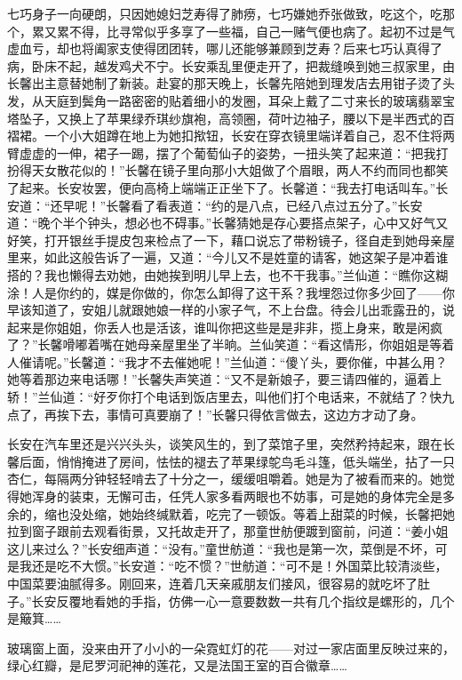 \par 七巧身子一向硬朗，只因她媳妇芝寿得了肺痨，七巧嫌她乔张做致，吃这个，吃那个，累又累不得，比寻常似乎多享了一些福，自己一赌气便也病了。起初不过是气虚血亏，却也将阖家支使得团团转，哪儿还能够兼顾到芝寿？后来七巧认真得了病，卧床不起，越发鸡犬不宁。长安乘乱里便走开了，把裁缝唤到她三叔家里，由长馨出主意替她制了新装。赴宴的那天晚上，长馨先陪她到理发店去用钳子烫了头发，从天庭到鬓角一路密密的贴着细小的发圈，耳朵上戴了二寸来长的玻璃翡翠宝塔坠子，又换上了苹果绿乔琪纱旗袍，高领圈，荷叶边袖子，腰以下是半西式的百褶裙。一个小大姐蹲在地上为她扣揿钮，长安在穿衣镜里端详着自己，忍不住将两臂虚虚的一伸，裙子一踢，摆了个葡萄仙子的姿势，一扭头笑了起来道：“把我打扮得天女散花似的！”长馨在镜子里向那小大姐做了个眉眼，两人不约而同也都笑了起来。长安妆罢，便向高椅上端端正正坐下了。长馨道：“我去打电话叫车。”长安道：“还早呢！”长馨看了看表道：“约的是八点，已经八点过五分了。”长安道：“晚个半个钟头，想必也不碍事。”长馨猜她是存心要搭点架子，心中又好气又好笑，打开银丝手提皮包来检点了一下，藉口说忘了带粉镜子，径自走到她母亲屋里来，如此这般告诉了一遍，又道：“今儿又不是姓童的请客，她这架子是冲着谁搭的？我也懒得去劝她，由她挨到明儿早上去，也不干我事。”兰仙道：“瞧你这糊涂！人是你约的，媒是你做的，你怎么卸得了这干系？我埋怨过你多少回了——你早该知道了，安姐儿就跟她娘一样的小家子气，不上台盘。待会儿出乖露丑的，说起来是你姐姐，你丢人也是活该，谁叫你把这些是是非非，揽上身来，敢是闲疯了？”长馨嗗嘟着嘴在她母亲屋里坐了半晌。兰仙笑道：“看这情形，你姐姐是等着人催请呢。”长馨道：“我才不去催她呢！”兰仙道：“傻丫头，要你催，中甚么用？她等着那边来电话哪！”长馨失声笑道：“又不是新娘子，要三请四催的，逼着上轿！”兰仙道：“好歹你打个电话到饭店里去，叫他们打个电话来，不就结了？快九点了，再挨下去，事情可真要崩了！”长馨只得依言做去，这边方才动了身。
\par 长安在汽车里还是兴兴头头，谈笑风生的，到了菜馆子里，突然矜持起来，跟在长馨后面，悄悄掩进了房间，怯怯的褪去了苹果绿鸵鸟毛斗篷，低头端坐，拈了一只杏仁，每隔两分钟轻轻啃去了十分之一，缓缓咀嚼着。她是为了被看而来的。她觉得她浑身的装束，无懈可击，任凭人家多看两眼也不妨事，可是她的身体完全是多余的，缩也没处缩，她始终缄默着，吃完了一顿饭。等着上甜菜的时候，长馨把她拉到窗子跟前去观看街景，又托故走开了，那童世舫便踱到窗前，问道：“姜小姐这儿来过么？”长安细声道：“没有。”童世舫道：“我也是第一次，菜倒是不坏，可是我还是吃不大惯。”长安道：“吃不惯？”世舫道：“可不是！外国菜比较清淡些，中国菜要油腻得多。刚回来，连着几天亲戚朋友们接风，很容易的就吃坏了肚子。”长安反覆地看她的手指，仿佛一心一意要数数一共有几个指纹是螺形的，几个是簸箕……
\par 玻璃窗上面，没来由开了小小的一朵霓虹灯的花——对过一家店面里反映过来的，绿心红瓣，是尼罗河祀神的莲花，又是法国王室的百合徽章……
